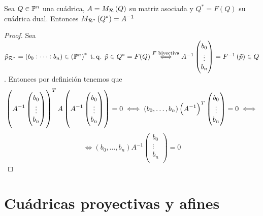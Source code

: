 \begin{prop}
  Sea $Q\in\mathbb{P}^n$ una cuádrica, $A=M_{\mathcal{R}}\left( Q\right)$ su matriz asociada y $Q^*=F(Q)$ su cuádrica dual.
  Entonces $M_{\mathcal{R}^*}\left( Q^* \right) = A^{-1}$
\end{prop}
\begin{proof}
  Sea $\tilde{p}_{\mathcal{R}^*}= \left( b_0:\dots:b_n\right) \in \left( \mathbb{P}^n \right) ^* \operatorname{\;t.q.\;} \tilde{p}\in Q^*=F(Q)
  \stackrel{F \text{ biyectiva}}{\iff} A^{-1}
  \begin{pmatrix}
    b_0\\
    \vdots\\
    b_n\\
  \end{pmatrix}=F^{-1}\left(\tilde{p}\right) \in Q$.
  Entonces por definición tenemos que 
  \[
    \left( A^{-1}
    \begin{pmatrix}
      b_0\\
      \vdots\\
      b_n\\
    \end{pmatrix}\right) ^T A \left( A^{-1}
    \begin{pmatrix}
      b_0\\
      \vdots\\
      b_n\\
    \end{pmatrix}\right)=0 \iff (b_0,\dots,b_n)\left( A^{-1}\right) ^T 
    \begin{pmatrix}
      b_0\\
      \vdots\\
      b_n\\
    \end{pmatrix}=0 \iff 
  \]
  \[
    \iff (b_0,\dots,b_n) A^{-1}
    \begin{pmatrix}
      b_0\\
      \vdots\\
      b_n\\
    \end{pmatrix}=0
  \]



\end{proof}

\section{Cuádricas proyectivas y afines}

